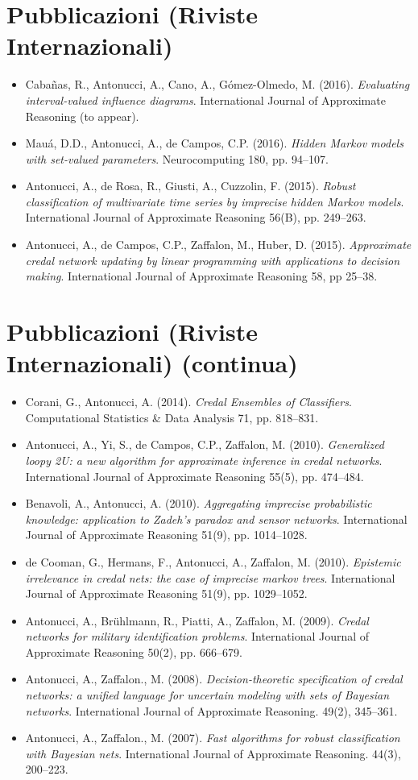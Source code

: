 \documentclass[12pt,a4paper]{moderncv}
\begin{document}
\section{Pubblicazioni (Riviste Internazionali)}
\begin{itemize}
\item Caba\~nas, R., Antonucci, A., Cano, A., G\'omez-Olmedo, M. (2016). \textit{Evaluating interval-valued influence diagrams}. International Journal of Approximate Reasoning (to appear).
\item Mau\'a, D.D., Antonucci, A., de Campos, C.P. (2016). \textit{Hidden Markov models with set-valued parameters}. Neurocomputing 180, pp. 94--107.
\item Antonucci, A., de Rosa, R., Giusti, A., Cuzzolin, F. (2015). \textit{Robust classification of multivariate time series by imprecise hidden Markov models}. International Journal of Approximate Reasoning 56(B), pp. 249--263.
\item Antonucci, A., de Campos, C.P., Zaffalon, M., Huber, D. (2015). \textit{Approximate credal network updating by linear programming with applications to decision making}. International Journal of Approximate Reasoning 58, pp 25--38.
\end{itemize}
\section{Pubblicazioni (Riviste Internazionali) (continua)}
\begin{itemize}
\item Corani, G., Antonucci, A. (2014). \textit{Credal Ensembles of Classifiers}. Computational Statistics \& Data Analysis 71, pp. 818--831.
\item Antonucci, A., Yi, S., de Campos, C.P., Zaffalon, M. (2010). \textit{Generalized loopy 2U: a new algorithm for approximate inference in credal networks}. International Journal of Approximate Reasoning 55(5), pp. 474--484.
\item Benavoli, A., Antonucci, A. (2010). \textit{Aggregating imprecise probabilistic knowledge: application to Zadeh's paradox and sensor networks}. International Journal of Approximate Reasoning 51(9), pp. 1014--1028.
\item de Cooman, G., Hermans, F., Antonucci, A., Zaffalon, M. (2010). \textit{Epistemic irrelevance in credal nets: the case of imprecise markov trees}. International Journal of Approximate Reasoning 51(9), pp. 1029--1052.
\item Antonucci, A., Br\"uhlmann, R., Piatti, A., Zaffalon, M. (2009). \textit{Credal networks for military identification problems}. International Journal of Approximate Reasoning 50(2), pp. 666--679.
\item Antonucci, A., Zaffalon., M. (2008). \textit{Decision-theoretic specification of credal networks: a unified language for uncertain modeling with sets of Bayesian networks}. International Journal of Approximate Reasoning. 49(2), 345--361.
\item Antonucci, A., Zaffalon., M. (2007). \textit{Fast algorithms for robust classification with Bayesian nets}. International Journal of Approximate Reasoning. 44(3), 200--223.
\end{itemize}
\end{document}
